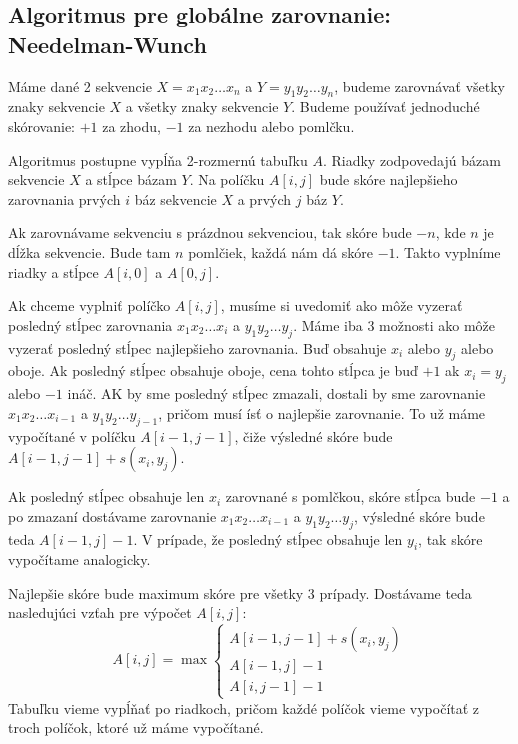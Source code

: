 \subsection{Algoritmus pre globálne zarovnanie: Needelman-Wunch}
Máme dané 2 sekvencie $X = x_1x_2\dots x_n$ a $Y = y_1y_2\dots y_n$, budeme zarovnávať všetky znaky sekvencie $X$ a všetky znaky sekvencie $Y$. Budeme používať jednoduché skórovanie: $+1$ za zhodu, $-1$ za nezhodu alebo pomlčku.


Algoritmus postupne vypĺňa 2-rozmernú tabuľku $A$. Riadky zodpovedajú bázam sekvencie $X$ a stĺpce bázam $Y$. Na políčku $A[i,j]$ bude skóre najlepšieho zarovnania prvých $i$ báz sekvencie $X$ a prvých $j$ báz $Y$.

Ak zarovnávame sekvenciu s prázdnou sekvenciou, tak skóre bude $-n$, kde $n$ je dĺžka sekvencie. Bude tam $n$ pomlčiek, každá nám dá skóre $-1$. Takto vyplníme riadky a stĺpce $A[i,0]$ a $A[0,j]$.

Ak chceme vyplniť políčko $A[i,j]$, musíme si uvedomiť ako môže vyzerať posledný stĺpec zarovnania $x_1x_2\dots x_i$ a $y_1y_2\dots y_j$. Máme iba 3 možnosti ako môže vyzerať posledný stĺpec najlepšieho zarovnania. Buď obsahuje $x_i$ alebo $y_j$ alebo oboje. Ak posledný stĺpec obsahuje oboje, cena tohto stĺpca je buď $+1$ ak $x_i = y_j$ alebo $-1$ ináč. AK by sme posledný stĺpec zmazali, dostali by sme zarovnanie $x_1x_2\dots x_{i-1}$ a $y_1y_2\dots y_{j-1}$, pričom musí ísť o najlepšie zarovnanie. To už máme vypočítané v políčku $A[i-1, j-1]$, čiže výsledné skóre bude $A[i-1, j-1] + s(x_i,y_j)$.

Ak posledný stĺpec obsahuje len $x_i$ zarovnané s pomlčkou, skóre stĺpca bude $-1$ a po zmazaní dostávame zarovnanie $x_1x_2\dots x_{i-1}$ a $y_1y_2\dots y_{j}$, výsledné skóre bude teda $A[i-1, j] -1$. V prípade, že posledný stĺpec obsahuje len $y_i$, tak skóre vypočítame analogicky.

Najlepšie skóre bude maximum skóre pre všetky 3 prípady.
Dostávame teda nasledujúci vzťah pre výpočet $A[i,j]$:
$$A[i,j] = \max \left\{ 
\begin{array}{l}
A[i-1,j-1]+s(x_i, y_j)\\ 
A[i-1,j]-1\\
A[i,j-1]-1 
\end{array} \right.$$
Tabuľku vieme vypĺňať po riadkoch, pričom každé políčok vieme vypočítať z troch políčok, ktoré už máme vypočítané. 

